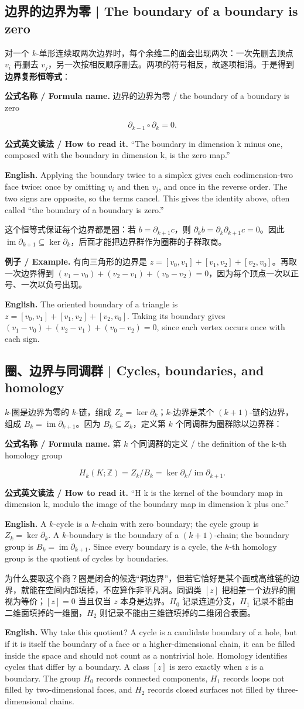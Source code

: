 \documentclass[UTF8,11pt,a4paper]{ctexart}
\newcommand{\EN}[1]{\par\noindent\textbf{English.} #1\par}
\newcommand{\READ}[1]{\par\noindent\textbf{公式英文读法 / How to read it.} #1\par}
\newcommand{\FORMULA}[2]{\par\noindent\textbf{公式名称 / Formula name.} #1 / #2\par}
\newcommand{\EX}[2]{\par\noindent\textbf{例子 / Example.} #1\par\EN{#2}}
\begin{document}
\subsection{边界的边界为零 | The boundary of a boundary is zero}
\noindent 对一个 $k$-单形连续取两次边界时，每个余维二的面会出现两次：一次先删去顶点 $v_i$ 再删去 $v_j$，另一次按相反顺序删去。两项的符号相反，故逐项相消。于是得到\textbf{边界复形恒等式}：
\FORMULA{边界的边界为零}{the boundary of a boundary is zero}
\[
\partial_{k-1}\circ\partial_k=0.
\]
\READ{“The boundary in dimension k minus one, composed with the boundary in dimension k, is the zero map.”}
\EN{Applying the boundary twice to a simplex gives each codimension-two face twice: once by omitting $v_i$ and then $v_j$, and once in the reverse order. The two signs are opposite, so the terms cancel. This gives the identity above, often called “the boundary of a boundary is zero.”}
\noindent 这个恒等式保证每个边界都是圈：若 $b=\partial_{k+1}c$，则 $\partial_kb=\partial_k\partial_{k+1}c=0$。因此 $\operatorname{im}\partial_{k+1}\subseteq\ker\partial_k$，后面才能把边界群作为圈群的子群取商。
\EX{有向三角形的边界是 $z=[v_0,v_1]+[v_1,v_2]+[v_2,v_0]$。再取一次边界得到 $(v_1-v_0)+(v_2-v_1)+(v_0-v_2)=0$，因为每个顶点一次以正号、一次以负号出现。}{The oriented boundary of a triangle is $z=[v_0,v_1]+[v_1,v_2]+[v_2,v_0]$. Taking its boundary gives $(v_1-v_0)+(v_2-v_1)+(v_0-v_2)=0$, since each vertex occurs once with each sign.}

\subsection{圈、边界与同调群 | Cycles, boundaries, and homology}
\noindent $k$-圈是边界为零的 $k$-链，组成 $Z_k=\ker\partial_k$；$k$-边界是某个 $(k+1)$-链的边界，组成 $B_k=\operatorname{im}\partial_{k+1}$。因为 $B_k\subseteq Z_k$，定义第 $k$ 个同调群为圈群除以边界群：
\FORMULA{第 $k$ 个同调群的定义}{the definition of the k-th homology group}
\[
H_k(K;\mathbb Z)=Z_k/B_k=\ker\partial_k/\operatorname{im}\partial_{k+1}.
\]
\READ{“H k is the kernel of the boundary map in dimension k, modulo the image of the boundary map in dimension k plus one.”}
\EN{A $k$-cycle is a $k$-chain with zero boundary; the cycle group is $Z_k=\ker\partial_k$. A $k$-boundary is the boundary of a $(k+1)$-chain; the boundary group is $B_k=\operatorname{im}\partial_{k+1}$. Since every boundary is a cycle, the $k$-th homology group is the quotient of cycles by boundaries.}
\noindent 为什么要取这个商？圈是闭合的候选“洞边界”，但若它恰好是某个面或高维链的边界，就能在空间内部填掉，不应算作非平凡洞。同调类 $[z]$ 把相差一个边界的圈视为等价；$[z]=0$ 当且仅当 $z$ 本身是边界。$H_0$ 记录连通分支，$H_1$ 记录不能由二维面填掉的一维圈，$H_2$ 则记录不能由三维链填掉的二维闭合表面。
\EN{Why take this quotient? A cycle is a candidate boundary of a hole, but if it is itself the boundary of a face or a higher-dimensional chain, it can be filled inside the space and should not count as a nontrivial hole. Homology identifies cycles that differ by a boundary. A class $[z]$ is zero exactly when $z$ is a boundary. The group $H_0$ records connected components, $H_1$ records loops not filled by two-dimensional faces, and $H_2$ records closed surfaces not filled by three-dimensional chains.}
\end{document}
